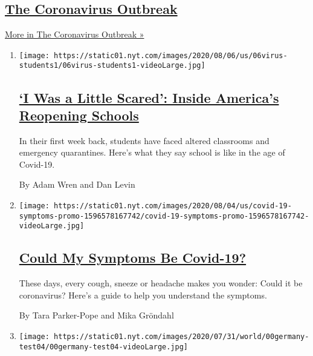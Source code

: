 \hypertarget{the-coronavirus-outbreak}{%
\subsection{\texorpdfstring{\href{/news-event/coronavirus}{The
Coronavirus
Outbreak}}{The Coronavirus Outbreak}}\label{the-coronavirus-outbreak}}

\href{/news-event/coronavirus}{More in The Coronavirus Outbreak »}

\begin{enumerate}
\def\labelenumi{\arabic{enumi}.}
\item
  \texttt{[image: https://static01.nyt.com/images/2020/08/06/us/06virus-students1/06virus-students1-videoLarge.jpg]}

  \hypertarget{i-was-a-little-scared-inside-americas-reopening-schools}{%
  \subsection{\texorpdfstring{\href{/2020/08/06/us/coronavirus-students.html}{`I
  Was a Little Scared': Inside America's Reopening
  Schools}}{`I Was a Little Scared': Inside America's Reopening Schools}}\label{i-was-a-little-scared-inside-americas-reopening-schools}}

  In their first week back, students have faced altered classrooms and
  emergency quarantines. Here's what they say school is like in the age
  of Covid-19.

  By Adam Wren and Dan Levin
\item
  \texttt{[image: https://static01.nyt.com/images/2020/08/04/us/covid-19-symptoms-promo-1596578167742/covid-19-symptoms-promo-1596578167742-videoLarge.jpg]}

  \hypertarget{could-my-symptoms-be-covid-19}{%
  \subsection{\texorpdfstring{\href{/interactive/2020/08/05/well/covid-19-symptoms.html}{Could
  My Symptoms Be
  Covid-19?}}{Could My Symptoms Be Covid-19?}}\label{could-my-symptoms-be-covid-19}}

  These days, every cough, sneeze or headache makes you wonder: Could it
  be coronavirus? Here's a guide to help you understand the symptoms.

  By Tara Parker-Pope and Mika Gröndahl
\item
  \texttt{[image: https://static01.nyt.com/images/2020/07/31/world/00germany-test04/00germany-test04-videoLarge.jpg]}


\end{enumerate}

